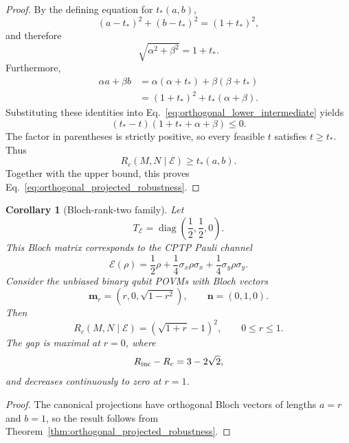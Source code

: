\documentclass[
aps,pra,twocolumn,10pt,
superscriptaddress,longbibliography,floatfix
]{revtex4-2}
\DeclareMathOperator{\diag}{diag}
\newtheorem{corollary}[theorem]{Corollary}
\begin{document}
\begin{proof}
By the defining equation for $t_*(a,b)$,
\[
(a-t_*)^2+(b-t_*)^2=(1+t_*)^2,
\]
and therefore
\[
\sqrt{\alpha^2+\beta^2}=1+t_*.
\]
Furthermore,
\begin{align*}
\alpha a+\beta b
&=
\alpha(\alpha+t_*)+\beta(\beta+t_*)
\\
&=
(1+t_*)^2+t_*(\alpha+\beta).
\end{align*}
Substituting these identities into Eq.~\eqref{eq:orthogonal_lower_intermediate} yields
\[
(t_*-t)
\left(
1+t_*+\alpha+\beta
\right)
\le0.
\]
The factor in parentheses is strictly positive, so every feasible $t$ satisfies $t\ge t_*$. Thus
\[
R_c(M,N\mid\mathcal E)\ge t_*(a,b).
\]
Together with the upper bound, this proves Eq.~\eqref{eq:orthogonal_projected_robustness}.
\end{proof}

\begin{corollary}[Bloch-rank-two family]
\label{cor:exact_intermediate_robustness}
Let
\[
T_{\mathcal E}
=
\diag\!\left(\frac12,\frac12,0\right).
\]
This Bloch matrix corresponds to the CPTP Pauli channel
\[
\mathcal E(\rho)
=
\frac12\rho
+\frac14\sigma_x\rho\sigma_x
+\frac14\sigma_y\rho\sigma_y.
\]
Consider the unbiased binary qubit POVMs with Bloch vectors
\[
\mathbf m_r=(r,0,\sqrt{1-r^2}),
\qquad
\mathbf n=(0,1,0).
\]
Then
\[
R_c(M,N\mid\mathcal E)
=
(\sqrt{1+r}-1)^2,
\qquad 0\le r\le1.
\]
The gap is maximal at $r=0$, where
\[
R_{\rm inc}-R_c=3-2\sqrt2,
\]
and decreases continuously to zero at $r=1$.
\end{corollary}

\begin{proof}
The canonical projections have orthogonal Bloch vectors of lengths $a=r$ and $b=1$, so the result follows from Theorem~\ref{thm:orthogonal_projected_robustness}.
\end{proof}
\end{document}
